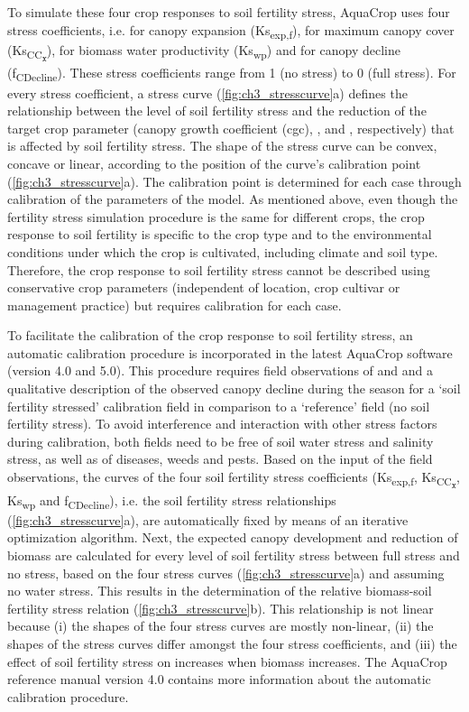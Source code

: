 To simulate these four crop responses to soil fertility stress, AquaCrop uses four stress coefficients, i.e. for canopy expansion (Ks\textsubscript{exp,f}), for maximum canopy cover (Ks\textsubscript{CC\textsubscript{x}}), for biomass water productivity (Ks\textsubscript{wp}) and for canopy decline (f\textsubscript{CDecline}). These stress coefficients range from 1 (no stress) to 0 (full stress). For every stress coefficient, a stress curve (\autoref{fig:ch3_stresscurve}a) defines the relationship between the level of soil fertility stress and the reduction of the target crop parameter (canopy growth coefficient (cgc), \CCx, \WPster and \CC, respectively) that is affected by soil fertility stress. The shape of the stress curve can be convex, concave or linear, according to the position of the curve's calibration point (\autoref{fig:ch3_stresscurve}a). The calibration point is determined for each case through calibration of the parameters of the model. As mentioned above, even though the fertility stress simulation procedure is the same for different crops, the crop response to soil fertility is specific to the crop type and to the environmental conditions under which the crop is cultivated, including climate and soil type. Therefore, the crop response to soil fertility stress cannot be described using conservative crop parameters (independent of location, crop cultivar or management practice) but requires calibration for each case. 

To facilitate the calibration of the crop response to soil fertility stress, an automatic calibration procedure is incorporated in the latest AquaCrop software (version 4.0 and 5.0). This procedure requires field observations of \CCx and \Brel and a qualitative description of the observed canopy decline during the season for a `soil fertility stressed' calibration field in comparison to a `reference' field (no soil fertility stress). To avoid interference and interaction with other stress factors during calibration, both fields need to be free of soil water stress and salinity stress, as well as of diseases, weeds and pests. Based on the input of the field observations, the curves of the four soil fertility stress coefficients (Ks\textsubscript{exp,f}, Ks\textsubscript{CC\textsubscript{x}}, Ks\textsubscript{wp} and f\textsubscript{CDecline}), i.e. the soil fertility stress relationships (\autoref{fig:ch3_stresscurve}a), are automatically fixed by means of an iterative optimization algorithm. Next, the expected canopy development and reduction of biomass are calculated for every level of soil fertility stress between full stress and no stress, based on the four stress curves (\autoref{fig:ch3_stresscurve}a) and assuming no water stress. This results in the determination of the relative biomass-soil fertility stress relation (\autoref{fig:ch3_stresscurve}b). This relationship is not linear because (i) the shapes of the four stress curves are mostly non-linear, (ii) the shapes of the stress curves differ amongst the four stress coefficients, and (iii) the effect of soil fertility stress on \WPster increases when biomass increases. The AquaCrop reference manual version 4.0 \parencite{raes2012} contains more information about the automatic calibration procedure.

